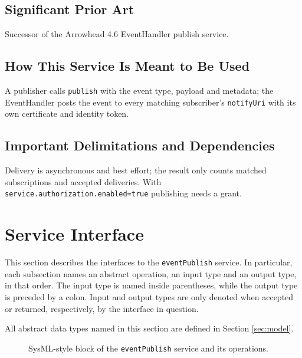 \documentclass[a4paper]{arrowhead}
\begin{document}
\subsection{Significant Prior Art}

Successor of the Arrowhead 4.6 EventHandler publish service.

\subsection{How This Service Is Meant to Be Used}

A publisher calls \texttt{publish} with the event type, payload and metadata; the EventHandler posts the event to every matching subscriber's \texttt{notifyUri} with its own certificate and identity token.

\subsection{Important Delimitations and Dependencies}
\label{sec:delimitations}

Delivery is asynchronous and best effort; the result only counts matched subscriptions and accepted deliveries. With \texttt{service.\allowbreak{}authorization.\allowbreak{}enabled=\allowbreak{}true} publishing needs a grant.

\newpage

\section{Service Interface}
\label{sec:operations}

This section describes the interfaces to the \texttt{eventPublish} service.
In particular, each subsection names an abstract operation, an input type and an output type, in that order.
The input type is named inside parentheses, while the output type is preceded by a colon.
Input and output types are only denoted when accepted or returned, respectively, by the interface in question.

All abstract data types named in this section are defined in Section \ref{sec:model}.

\begin{figure}[ht!]
  \centering
  \caption{SysML-style block of the \texttt{eventPublish} service and its operations.}
  \label{fig:SD}
\end{figure}
\end{document}
